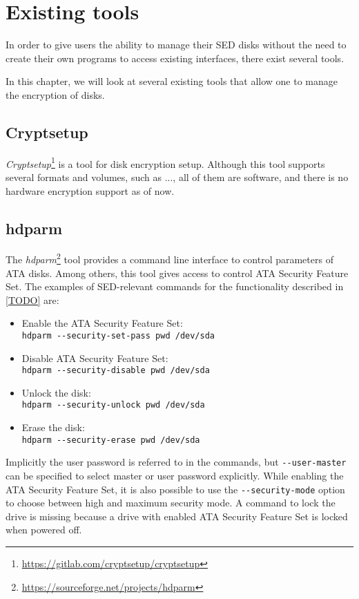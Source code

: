 
\chapter{Existing tools}
\label{chapter_tools}

In order to give users the ability to manage their SED disks without the need to create their own programs to access existing interfaces, there exist several tools. 

In this chapter, we will look at several existing tools that allow one to manage the encryption of disks.

\section{Cryptsetup}

\emph{Cryptsetup}\footnote{\url{https://gitlab.com/cryptsetup/cryptsetup}} is a tool for disk encryption setup. Although this tool supports several formats and volumes, such as ..., all of them are software, and there is no hardware encryption support as of now.

\section{hdparm}
 
The \emph{hdparm}\footnote{\url{https://sourceforge.net/projects/hdparm}} tool provides a command line interface to control parameters of ATA disks. Among others, this tool gives access to control ATA Security Feature Set.
The examples of SED-relevant commands for the functionality described in \ref{TODO} are:
\begin{itemize}
\item Enable the ATA Security Feature Set:\\ \verb|hdparm --security-set-pass pwd /dev/sda|
\item Disable ATA Security Feature Set:\\ \verb|hdparm --security-disable pwd /dev/sda|
\item Unlock the disk:\\ \verb|hdparm --security-unlock pwd /dev/sda|
\item Erase the disk:\\ \verb|hdparm --security-erase pwd /dev/sda|
\end{itemize}
Implicitly the user password is referred to in the commands, but \verb|--user-master| can be specified to select master or user password explicitly. While enabling the ATA Security Feature Set, it is also possible to use the \verb|--security-mode| option to choose between high and maximum security mode.
A command to lock the drive is missing because a drive with enabled ATA Security Feature Set is locked when powered off.

